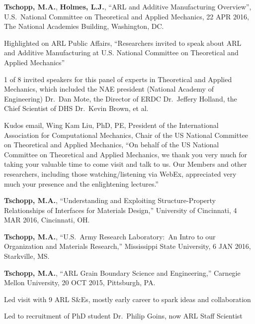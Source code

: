 \begin{cvlist}
\item
\textbf{Tschopp, M.A.}, \textbf{Holmes, L.J.}, ``ARL and Additive Manufacturing Overview'', U.S.~National Committee on Theoretical and Applied Mechanics, 22 APR 2016, The National Academies Building, Washington, DC.
\begin{list2}
\item[$\star$] Highlighted on ARL Public Affairs, ``Researchers invited to speak about ARL and Additive Manufacturing at U.S. National Committee on Theoretical and Applied Mechanics''
\item[$\star$] 1 of 8 invited speakers for this panel of experts in Theoretical and Applied Mechanics, which included the NAE president (National Academy of Engineering) Dr.~Dan Mote, the Director of ERDC Dr.~Jeffery Holland, the Chief Scientist of DHS Dr.~Kevin Brown, et al.
\item[$\star$] Kudos email, Wing Kam Liu, PhD, PE, President of the International Association for Computational Mechanics, Chair of the US National Committee on Theoretical and Applied Mechanics, ``On behalf of the US National Committee on Theoretical and Applied Mechanics, we thank you very much for taking your valuable time to come visit and talk to us. Our Members and other researchers, including those watching/listening via WebEx, appreciated very much your presence and the enlightening lectures.''
\end{list2}

\item
\textbf{Tschopp, M.A.}, ``Understanding and Exploiting Structure-Property Relationships of Interfaces for Materials Design,'' University of Cincinnati, 4 MAR 2016, Cincinnati, OH.

\item
\textbf{Tschopp, M.A.}, ``U.S.~Army Research Laboratory:~An Intro to our Organization and Materials Research,'' Mississippi State University, 6 JAN 2016, Starkville, MS.

\item
\textbf{Tschopp, M.A.}, ``ARL Grain Boundary Science and Engineering,'' Carnegie Mellon University, 20 OCT 2015, Pittsburgh, PA.
\begin{list2}
\item[$\star$] Led visit with 9 ARL S\&Es, mostly early career to spark ideas and collaboration
\item[$\star$] Led to recruitment of PhD student Dr.~Philip Goins, now ARL Staff Scientist
\end{list2}


\end{cvlist}
